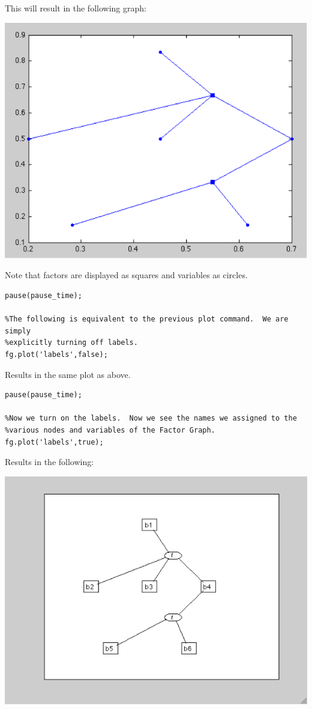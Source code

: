 This will result in the following graph:


\includegraphics{images/plot1.png}

Note that factors are displayed as squares and variables as circles.

\begin{lstlisting}
pause(pause_time);
 
%The following is equivalent to the previous plot command.  We are simply
%explicitly turning off labels.
fg.plot('labels',false);
\end{lstlisting}

Results in the same plot as above.

\begin{lstlisting}
pause(pause_time);
 
%Now we turn on the labels.  Now we see the names we assigned to the
%various nodes and variables of the Factor Graph.
fg.plot('labels',true);
\end{lstlisting}

Results in the following:
 

 
\includegraphics{images/plot2.png}

